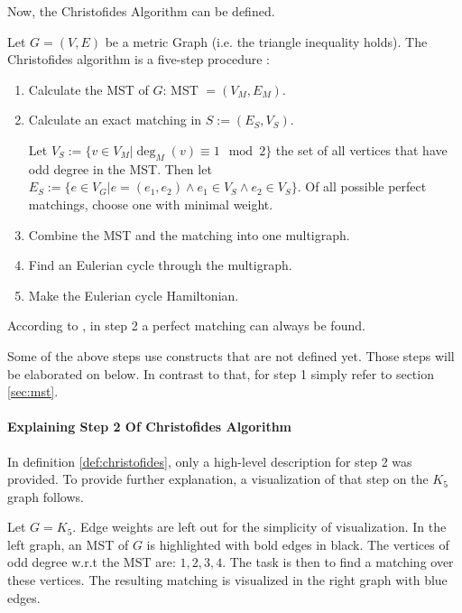 Now, the Christofides Algorithm can be defined.

\begin{definition}
  Let $G = (V, E)$ be a metric Graph (i.e. the triangle inequality holds).
  The Christofides algorithm is a five-step procedure \cite{christofides_worst-case_1976}:
    \begin{enumerate}
      \item Calculate the \ac{MST} of $G$: \ac{MST} $= (V_{M}, E_{M})$.
      \item Calculate an exact matching in $S:= (E_S, V_S)$.

        Let $V_S := \{v \in V_M | \deg_M(v) \equiv 1 \mod 2\}$ the set of all vertices that have
        odd degree in the \ac{MST}.
        Then let $E_S := \{e \in V_G | e = (e_1, e_2) \wedge e_1 \in V_S \wedge e_2 \in V_S\}$.
        Of all possible perfect matchings, choose one with minimal weight.
      \item Combine the \ac{MST} and the matching into one multigraph.
      \item Find an Eulerian cycle through the multigraph.
      \item Make the Eulerian cycle Hamiltonian.
    \end{enumerate}
    \label{def:christofides}
\end{definition}
\begin{remark}
  According to \cite{christofides_worst-case_1976}, in step 2 a perfect matching
  can always be found.
\end{remark}

Some of the above steps use constructs that are not defined yet. 
Those steps will be elaborated on below.
In contrast to that, for step 1 simply refer to section \ref{sec:mst}.

\paragraph{Explaining Step 2 Of Christofides Algorithm}

In definition \ref{def:christofides}, only a high-level description for step 2 was provided.
To provide further explanation, a visualization of that step on the $K_5$ graph follows.

Let $G = K_5$. Edge weights are left out for the simplicity of visualization.
In the left graph,
an \ac{MST} of $G$ is highlighted with bold edges in black.
The vertices of odd degree w.r.t the MST are: $1,2,3,4$.
The task is then to find a matching over these vertices.
The resulting matching is visualized in the right graph with blue edges.

